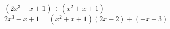 {$\left(2x^3-x+1 \right) \div \left(x^{2} +x+1 \right)$ }
{$2x^3-x+1 = \left(x^2+x+1\right)(2x-2)+(-x+3)$}
